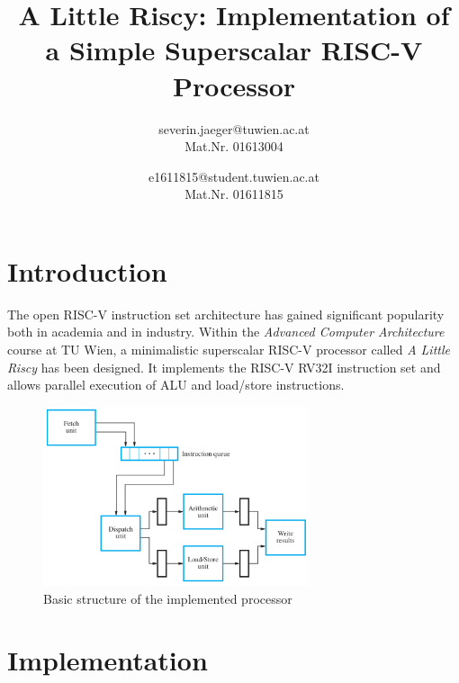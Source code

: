 \documentclass[conference]{IEEEtran}
\begin{document}
\title{A Little Riscy: Implementation of a Simple Superscalar RISC-V Processor
}

\author{
severin.jaeger@tuwien.ac.at\\
Mat.Nr. 01613004\\

\and
{}
e1611815@student.tuwien.ac.at\\
Mat.Nr. 01611815\\
}

\maketitle

\begin{abstract}
\end{abstract}

\section{Introduction}
The open RISC-V instruction set architecture has gained significant popularity both in academia and in industry. Within the \emph{Advanced Computer Architecture} course at TU Wien, a minimalistic superscalar RISC-V processor called \emph{A Little Riscy} has been designed. It implements the RISC-V RV32I instruction set and allows parallel execution of ALU and load/store instructions.


\begin{figure} [!h]
	\centering
	\includegraphics[width=7.8cm]{basic_architecture.PNG}
	\caption{Basic structure of the implemented processor \cite{Hamacher}}
	\label{fig:basic_arch}
\end{figure}

\section{Implementation}
\end{document}
